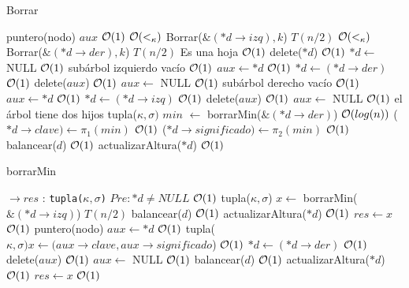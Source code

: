 \begin{Algoritmos}
\begin{algorithm}
\caption{Borrar}
\begin{algorithmic}[1]
	\State puntero(nodo) $aux$
	\Comment $\mathcal{O}(1)$
	\Comment $\mathcal{O}(<_{\kappa})$
		\State Borrar($\&(*d\to izq), k$)
		\Comment $T(n/2)$
	\Else 
		\Comment $\mathcal{O}(<_{\kappa})$
			\State Borrar($\&(*d\to der), k$)
			\Comment $T(n/2)$
		\Else 
				\Comment Es una hoja $\mathcal{O}(1)$
				\State delete($*d$)
				\Comment $\mathcal{O}(1)$
				\State $*d\gets$ NULL
				\Comment $\mathcal{O}(1)$
			\Else
					\Comment subárbol izquierdo vacío $\mathcal{O}(1)$
					\State $aux \gets *d$
					\Comment $\mathcal{O}(1)$
					\State $*d\gets (*d\to der)$
					\Comment $\mathcal{O}(1)$
					\State delete($aux$)
					\Comment $\mathcal{O}(1)$
					\State $aux \gets$ NULL
					\Comment $\mathcal{O}(1)$
				\Else
						\Comment subárbol derecho vacío $\mathcal{O}(1)$
						\State $aux \gets *d$
						\Comment $\mathcal{O}(1)$
						\State $*d\gets (*d\to izq)$
						\Comment $\mathcal{O}(1)$
						\State delete($aux$)
						\Comment $\mathcal{O}(1)$
						\State $aux \gets$ NULL
						\Comment $\mathcal{O}(1)$
					\Else
						\Comment el árbol tiene dos hijos
						\State tupla($\kappa, \sigma)$ $min$ $\gets$ borrarMin($\&(*d\to der)$)
						\Comment $\mathcal{O}(log(n))$
						\State($*d\to clave) \gets \pi_1(min)$
						\Comment $\mathcal{O}(1)$
						\State($*d\to significado) \gets \pi_2(min)$
						\Comment $\mathcal{O}(1)$
					\EndIf
				\EndIf
			\EndIf 
		\EndIf
	\EndIf
	\State balancear($d$)
	\Comment $\mathcal{O}(1)$
	\State actualizarAltura($*d$)
	\Comment $\mathcal{O}(1)$
\EndProcedure
\end{algorithmic}
\end{algorithm}

\begin{algorithm}
\caption{borrarMin}
\begin{algorithmic}[1]
$\to res$ : \texttt{tupla($\kappa, \sigma$)}
	\Comment $Pre: *d \neq NULL$
	\Comment $\mathcal{O}(1)$
		\State tupla($\kappa, \sigma$) $x\gets$ borrarMin($\&(*d\to izq)$)
		\Comment $T(n/2)$
		\State balancear($d$)
		\Comment $\mathcal{O}(1)$
		\State actualizarAltura($*d$)
		\Comment $\mathcal{O}(1)$
		\State $res \gets x$
		\Comment $\mathcal{O}(1)$
	\Else
		\State puntero(nodo) $aux \gets *d$
		\Comment $\mathcal{O}(1)$
		\State tupla($\kappa, \sigma) x \gets (aux\to clave, aux\to significado$)
		\Comment $\mathcal{O}(1)$
		\State $*d\gets (*d\to der)$
		\Comment $\mathcal{O}(1)$
		\State delete($aux$)
		\Comment $\mathcal{O}(1)$
		\State $aux \gets$ NULL
		\Comment $\mathcal{O}(1)$
		\State balancear($d$)
		\Comment $\mathcal{O}(1)$
		\State actualizarAltura($*d$)
		\Comment $\mathcal{O}(1)$
		\State $res \gets x$
		\Comment $\mathcal{O}(1)$
	\EndIf
\EndProcedure
\end{algorithmic}
\end{algorithm}

\end{Algoritmos}